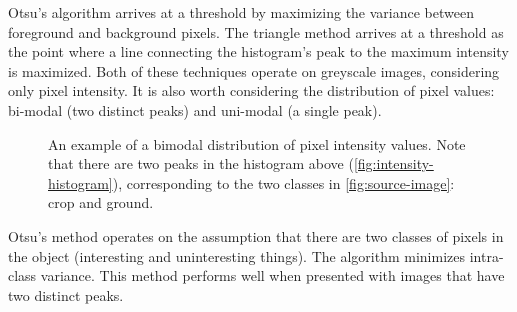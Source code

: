 \documentclass[letterpaper]{report}
\begin{document}
{ Otsu's algorithm arrives at a threshold by maximizing the variance between foreground and background pixels. The triangle method arrives at a threshold as the point where a line connecting the histogram’s peak to the maximum intensity is maximized. Both of these techniques operate on greyscale images, considering only pixel intensity. 
It is also worth considering the distribution of pixel values: bi-modal (two distinct peaks) and uni-modal (a single peak).

%

\begin{figure}[h]
	\centering
		\hfil
	\caption[Bimodal distribution of pixel intensity]{An example of a bimodal distribution of pixel intensity values. Note that there are two peaks in the histogram above (\ref{fig:intensity-histogram}), corresponding to the two classes in \ref{fig:source-image}: crop and ground.}
	\label{fig:intensity}
\end{figure}

Otsu's method operates on the assumption that there are two classes of pixels in the object (interesting and uninteresting things). The algorithm minimizes intra-class variance. This method performs well when presented with images that have two distinct peaks.

}
\end{document}
